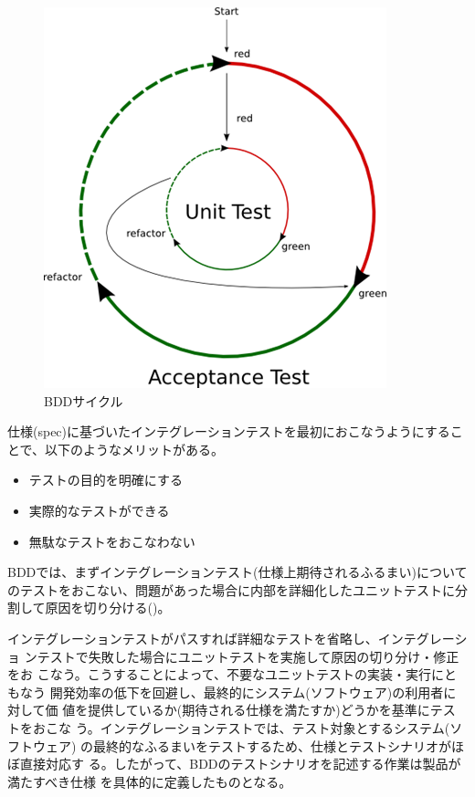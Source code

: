 \begin{figure}
 \vspace*{-\intextsep}
 \includegraphics[width=16zw]{img/bdd-cycle.png}
 \caption{BDDサイクル\cite{bdd-cycle-figref}}
 \label{fig:bdd-cycle}
\end{figure}

仕様(spec)に基づいたインテグレーションテストを最初におこなうようにするこ
とで、以下のようなメリットがある。
\begin{itemize}
 \item テストの目的を明確にする
 \item 実際的なテストができる
 \item 無駄なテストをおこなわない
\end{itemize}

BDDでは、まずインテグレーションテスト(仕様上期待されるふるまい)について
のテストをおこない、問題があった場合に内部を詳細化したユニットテストに分
割して原因を切り分ける()。

インテグレーションテストがパスすれば詳細なテストを省略し、インテグレーショ
ンテストで失敗した場合にユニットテストを実施して原因の切り分け・修正をお
こなう。こうすることによって、不要なユニットテストの実装・実行にともなう
開発効率の低下を回避し、最終的にシステム(ソフトウェア)の利用者に対して価
値を提供しているか(期待される仕様を満たすか)どうかを基準にテストをおこな
う。インテグレーションテストでは、テスト対象とするシステム(ソフトウェア)
の最終的なふるまいをテストするため、仕様とテストシナリオがほぼ直接対応す
る。したがって、BDDのテストシナリオを記述する作業は製品が満たすべき仕様
を具体的に定義したものとなる。

